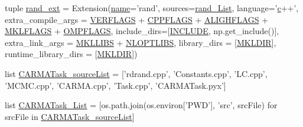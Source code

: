 \begin{DoxyCompactItemize}
\item 
tuple \hyperlink{namespacesetup_a72a912c8df91f65b2a80db002d55f4ff}{rand\-\_\-ext} = Extension(\hyperlink{namespacesetup_a61de3710bf6c9d78c0afa352263f8b09}{name}='rand', sources=\hyperlink{namespacesetup_a7c78e16e81c92c4cb8ed8c293b885193}{rand\-\_\-\-List}, language='\hyperlink{_constants_8cpp_a2c09e929a6ea340fc9653cca414b11d3}{c}++', extra\-\_\-compile\-\_\-args = \hyperlink{namespacesetup_a4b1725ffabf7e972e9416fc047daa758}{V\-E\-R\-F\-L\-A\-G\-S} + \hyperlink{namespacesetup_a94afbb2834cc36eb3a362aec00c4f0bb}{C\-P\-P\-F\-L\-A\-G\-S} + \hyperlink{namespacesetup_ad6de2d2793e8dad016a00e201563ff15}{A\-L\-I\-G\-H\-F\-L\-A\-G\-S} + \hyperlink{namespacesetup_a356d52830aa81f3e0cfda1095f3162f8}{M\-K\-L\-F\-L\-A\-G\-S} + \hyperlink{namespacesetup_aa0d1a93d0a5a5a10a02c0cac8dbcaa02}{O\-M\-P\-F\-L\-A\-G\-S}, include\-\_\-dirs=\mbox{[}\hyperlink{namespacesetup_acf0d303c559d8ca52f78fb7970b2de4d}{I\-N\-C\-L\-U\-D\-E}, np.\-get\-\_\-include()\mbox{]}, extra\-\_\-link\-\_\-args = \hyperlink{namespacesetup_a3ecd92f8e1e53dd6528359a08aee59e9}{M\-K\-L\-L\-I\-B\-S} + \hyperlink{namespacesetup_ae8e55c011b0f75d872a51166b37395ae}{N\-L\-O\-P\-T\-L\-I\-B\-S}, library\-\_\-dirs = \mbox{[}\hyperlink{namespacesetup_a71664edfdcf98a1ed2159a5cb4a7d196}{M\-K\-L\-D\-I\-R}\mbox{]}, runtime\-\_\-library\-\_\-dirs = \mbox{[}\hyperlink{namespacesetup_a71664edfdcf98a1ed2159a5cb4a7d196}{M\-K\-L\-D\-I\-R}\mbox{]})
\item 
list \hyperlink{namespacesetup_a76df4fd83158e36d10a07aced7b11e8f}{C\-A\-R\-M\-A\-Task\-\_\-source\-List} = \mbox{[}'rdrand.\-cpp', 'Constants.\-cpp', 'L\-C.\-cpp', 'M\-C\-M\-C.\-cpp', 'C\-A\-R\-M\-A.\-cpp', 'Task.\-cpp', 'C\-A\-R\-M\-A\-Task.\-pyx'\mbox{]}
\item 
list \hyperlink{namespacesetup_aae98c7021359c0fe9ff337761d5c1dc5}{C\-A\-R\-M\-A\-Task\-\_\-\-List} = \mbox{[}os.\-path.\-join(os.\-environ\mbox{[}'P\-W\-D'\mbox{]}, 'src', src\-File) for src\-File in \hyperlink{namespacesetup_a76df4fd83158e36d10a07aced7b11e8f}{C\-A\-R\-M\-A\-Task\-\_\-source\-List}\mbox{]}
\item 

\end{DoxyCompactItemize}

